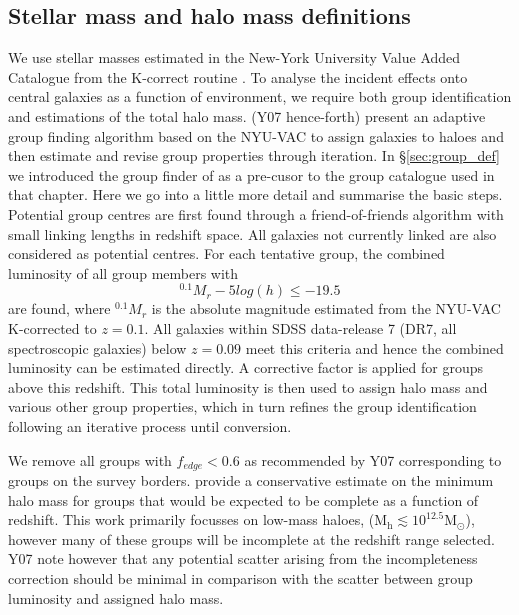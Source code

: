 \subsection{Stellar mass and halo mass definitions} \label{sec:mass_hab}
We use stellar masses estimated in the New-York University Value Added Catalogue from the K-correct routine \citep[NYU-VAC;][]{blanton2005}. To analyse the incident effects onto central galaxies as a function of environment, we require both group identification and estimations of the total halo mass. \citet{yang2007} (Y07 hence-forth) present an adaptive group finding algorithm based on the NYU-VAC to assign galaxies to haloes and then estimate and revise group properties through iteration. In \S\ref{sec:group_def} we introduced the group finder of \citet{yang2007} as a pre-cusor to the group catalogue \citep{lim2017} used in that chapter. Here we go into a little more detail and summarise the basic steps. Potential group centres are first found through a friend-of-friends algorithm with small linking lengths in redshift space. All galaxies not currently linked are also considered as potential centres. For each tentative group, the combined luminosity of all group members with 
\begin{equation}
^{0.1}M_r - 5log(h) \leq -19.5
\end{equation}
are found, where $^{0.1}M_r$ is the absolute magnitude estimated from the NYU-VAC K-corrected to $z=0.1$. All galaxies within SDSS data-release 7 (DR7, all spectroscopic galaxies) below $z=0.09$ meet this criteria and hence the combined luminosity can be estimated directly. A corrective factor is applied for groups above this redshift. This total luminosity is then used to assign halo mass and various other group properties, which in turn refines the group identification following an iterative process until conversion. 

We remove all groups with $f_{edge} < 0.6$ as recommended by Y07 corresponding to groups on the survey borders. \citet{yang2009} provide a conservative estimate on the minimum halo mass for groups that would be expected to be complete as a function of redshift. This work primarily focusses on low-mass haloes, ($\mathrm{M_h \lesssim 10^{12.5} M_{\odot}}$), however many of these groups will be incomplete at the redshift range selected. Y07 note however that any potential scatter arising from the incompleteness correction should be minimal in comparison with the scatter between group luminosity and assigned halo mass. 

